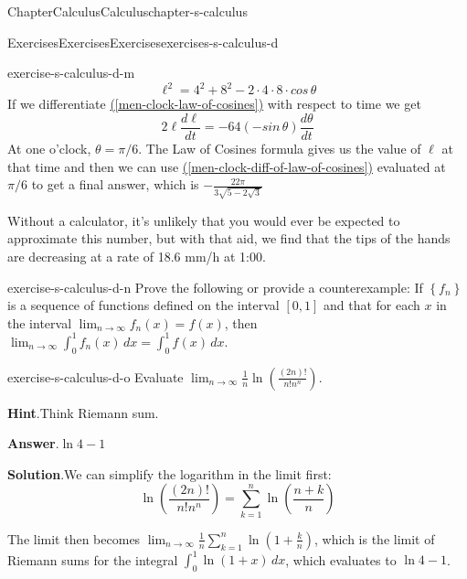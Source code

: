 \documentclass[oneside,10pt,]{book}
\newcommand{\blocktitlefont}{\relax}
\newcommand{\xreffont}{\relax}
\numberwithin{equation}{section}
\begin{document}
\begin{chapterptx}{Chapter}{Calculus}{}{Calculus}{}{}{chapter-s-calculus}
\begin{exercises-section}{Exercises}{Exercises}{}{Exercises}{}{}{exercises-s-calculus-d}
\begin{divisionexercise}{12}{}{}{exercise-s-calculus-d-m}
\begin{equation}
\ell^2 = 4^2 + 8^2 -2\cdot 4\cdot 8\cdot cos\, \theta\label{men-clock-law-of-cosines}
\end{equation}
If we differentiate \hyperref[men-clock-law-of-cosines]{({\xreffont\ref{men-clock-law-of-cosines}})}  with respect to time  we get%
\begin{equation}
2 \ell \frac{d\ell}{dt} = -64(-sin\, \theta)\frac{d\theta}{dt}\label{men-clock-diff-of-law-of-cosines}
\end{equation}
At one o'clock, \(\theta = \pi/6\).   The Law of Cosines formula gives us the value of \(\ell\) at that time and  then  we can use \hyperref[men-clock-diff-of-law-of-cosines]{({\xreffont\ref{men-clock-diff-of-law-of-cosines}})} evaluated at \(\pi/6\) to get a final answer, which is \(-\frac{22 \pi}{3 \sqrt{5-2\sqrt{3}}}\)%
\par
Without a calculator, it's unlikely that you would ever be expected to approximate this number, but with that aid, we find that the tips of the hands are decreasing at a rate of 18.6 mm\slash{}h at 1:00.%
\end{divisionexercise}%
\begin{divisionexercise}{13}{}{}{exercise-s-calculus-d-n}%
Prove the following or provide a counterexample:  If \(\left\{f_n\right\}\) is a sequence of functions defined on the interval \([0,1]\) and that for each \(x\) in the interval \(\lim_{n\to \infty } f_n(x) = f(x)\),  then    \(\lim_{n\to \infty } \int_0^1 f_n(x) \, dx=\int_0^1 f(x)
\, dx\).%
\end{divisionexercise}%
\begin{divisionexercise}{14}{}{}{exercise-s-calculus-d-o}%
Evaluate \(\lim_{n \rightarrow \infty} \frac{1}{n}\ln{\left(\frac{(2n)!}{n! n^n}\right)}\).%
\par\smallskip%
\noindent\textbf{\blocktitlefont Hint}.\hypertarget{hint-s-calculus-d-o-b}{}\quad{}Think Riemann sum.%
\par\smallskip%
\noindent\textbf{\blocktitlefont Answer}.\hypertarget{answer-s-calculus-d-o-c}{}\quad{}\(\ln{4}-1\)%
\par\smallskip%
\noindent\textbf{\blocktitlefont Solution}.\hypertarget{solution-s-calculus-d-o-d}{}\quad{}We can simplify the logarithm in the limit first:%
\begin{equation*}
\ln\left(\frac{ (2 n)!}{n! n^n}\right) = \sum_{k=1}^n \ln{(\frac{n+k}{n})}
\end{equation*}
%
\par
The limit then becomes \(\lim_{n \rightarrow \infty} \frac{1}{n}\sum_{k=1}^n \ln{(1+\frac{k}{n})}\), which is the limit of Riemann sums for the integral \(\int_0^1 \ln{(1+x)}\,dx\), which evaluates to \(\ln{4}-1\).%

\end{divisionexercise}
\end{exercises-section}
\end{chapterptx}
\end{document}

